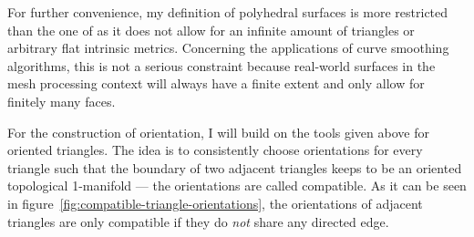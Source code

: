 \documentclass{stdlocal}
\begin{document}
  For further convenience, my definition of polyhedral surfaces is more restricted than the one of \textcite{polthier2006} as it does not allow for an infinite amount of triangles or arbitrary flat intrinsic metrics.
  Concerning the applications of curve smoothing algorithms, this is not a serious constraint because real-world surfaces in the mesh processing context will always have a finite extent and only allow for finitely many faces.

  For the construction of orientation, I will build on the tools given above for oriented triangles.
  The idea is to consistently choose orientations for every triangle such that the boundary of two adjacent triangles keeps to be an oriented topological 1-manifold --- the orientations are called compatible.
  As it can be seen in figure~\ref{fig:compatible-triangle-orientations}, the orientations of adjacent triangles are only compatible if they do \textit{not} share any directed edge.
\end{document}
